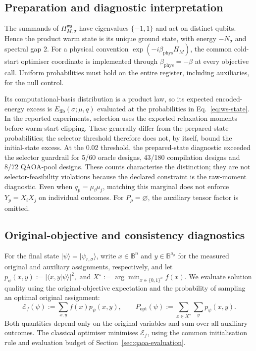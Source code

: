 \documentclass[a4paper,onecolumn,11pt,unpublished]{quantumarticle}
\theoremstyle{remark}
\begin{document}
\subsection{Preparation and diagnostic interpretation}
The summands of $H_{M,\sigma}^{\mathrm{ws}}$ have eigenvalues $\{-1,1\}$
and act on distinct qubits. Hence the product warm state is its unique
ground state, with energy $-N_\sigma$ and spectral gap $2$.
For a physical convention $\exp(-i\beta_{\mathrm{phys}}H_M)$,
the common cold-start optimiser coordinate is implemented through
$\beta_{\mathrm{phys}}=-\beta$ at every objective call. Uniform probabilities
must hold on the entire register, including auxiliaries, for the null control.

Its computational-basis distribution is a product law, so its expected
encoded-energy excess is \(E_{\mathrm{fib}}(\sigma;\mu,q)\) evaluated at the
probabilities in Eq.~\eqref{eq:ws-state}. In the reported experiments,
selection uses the exported relaxation moments before warm-start clipping.
These generally differ from the prepared-state probabilities; the selector
threshold therefore does not, by itself, bound the initial-state excess.
At the 0.02 threshold, the prepared-state diagnostic exceeded the selector
guardrail for 5/60 oracle designs, 43/180 compilation designs and 8/72
QAOA-pool designs. These counts characterise the distinction; they are not
selector-feasibility violations because the declared constraint is the raw-moment
diagnostic.
Even when \(q_p=\mu_i\mu_j\), matching this marginal does not enforce
\(Y_p=X_iX_j\) on individual outcomes.
For \(P_\rho=\varnothing\), the auxiliary tensor factor is omitted.

\subsection{Original-objective and consistency diagnostics}
For the final state $|\psi\rangle=|\psi_{r,\sigma}\rangle$, write
$x\in\mathbb B^n$ and $y\in\mathbb B^{a_\sigma}$ for the measured original
and auxiliary assignments, respectively, and let
\(
p_\psi(x,y):=|\langle x,y|\psi\rangle|^2,
\text{ and }
X^\star:=\arg\min_{x\in\{0,1\}^n}f(x).
\)
We evaluate solution quality using the original-objective expectation
and the probability of sampling an optimal original assignment:
\[
\mathcal E_f(\psi):=\sum_{x,y}f(x)p_\psi(x,y),
\qquad
P_{\mathrm{opt}}(\psi):=\sum_{x\in X^\star}\sum_y p_\psi(x,y).
\]
Both quantities depend only on the original variables and sum over
all auxiliary outcomes. The classical optimiser minimises
$\mathcal E_f$, using the common initialisation rule and evaluation
budget of Section~\ref{sec:qaoa-evaluation}.
\end{document}
